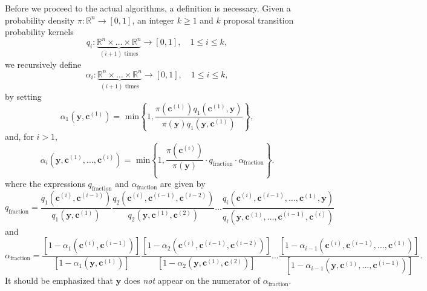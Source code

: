 Before we proceed to the actual algorithms, a definition is necessary.
Given a probability density $\pi:\mathbb{R}^n\rightarrow [0,1]$,
an integer $k\geqslant 1$ and
$k$ proposal transition probability kernels
\begin{equation*}
q_i:\underbrace{\mathbb{R}^n\times\ldots\times\mathbb{R}^n}_{(i+1)\mbox{ times}}\rightarrow [0,1],\quad 1\leqslant i\leqslant k,
\end{equation*}
we recursively define
\begin{equation}\label{eq-alphas}
\alpha_i:\underbrace{\mathbb{R}^n\times\ldots\times\mathbb{R}^n}_{(i+1)\mbox{ times}}\rightarrow [0,1],\quad 1\leqslant i\leqslant k,
\end{equation}
by setting
\begin{equation*}
\alpha_1(\mathbf{y},\mathbf{c}^{(1)}) = \mbox{ min}
\left\{
1,\frac
{\pi(\mathbf{c}^{(1)})q_1(\mathbf{c}^{(1)},\mathbf{y})}
{\pi(\mathbf{y})q_1(\mathbf{y},\mathbf{c}^{(1)})}
\right\},
\end{equation*}
and, for $i>1$,
\begin{equation*}
\alpha_i(\mathbf{y},\mathbf{c}^{(1)},\ldots,\mathbf{c}^{(i)}) = \mbox{ min}
\left\{
1,\frac
{\pi(\mathbf{c}^{(i)})}
{\pi(\mathbf{y})}
\cdot q_{\mbox{fraction}}
\cdot \alpha_{\mbox{fraction}}
\right\}.
\end{equation*}
where
the expressions $q_{\mbox{fraction}}$ and $\alpha_{\mbox{fraction}}$ are given by
\begin{equation*}
q_{\mbox{fraction}}=
\frac
{q_1(\mathbf{c}^{(i)},\mathbf{c}^{(i-1)})}
{q_1(\mathbf{y},\mathbf{c}^{(1)})}
\frac
{q_2(\mathbf{c}^{(i)},\mathbf{c}^{(i-1)},\mathbf{c}^{(i-2)})}
{q_2(\mathbf{y},\mathbf{c}^{(1)},\mathbf{c}^{(2)})}
\ldots
\frac
{q_i(\mathbf{c}^{(i)},\mathbf{c}^{(i-1)},\ldots,\mathbf{c}^{(1)},\mathbf{y})}
{q_i(\mathbf{y},\mathbf{c}^{(1)},\ldots,\mathbf{c}^{(i-1)},\mathbf{c}^{(i)})}
\end{equation*}
and
\begin{equation*}
\alpha_{\mbox{fraction}}=
\frac
{[1-\alpha_1(\mathbf{c}^{(i)},\mathbf{c}^{(i-1)})]}
{[1-\alpha_1(\mathbf{y},\mathbf{c}^{(1)})]}
\frac
{[1-\alpha_2(\mathbf{c}^{(i)},\mathbf{c}^{(i-1)},\mathbf{c}^{(i-2)})]}
{[1-\alpha_2(\mathbf{y},\mathbf{c}^{(1)},\mathbf{c}^{(2)})]}
\ldots
\frac
{[1-\alpha_{i-1}(\mathbf{c}^{(i)},\mathbf{c}^{(i-1)},\ldots,\mathbf{c}^{(1)})]}
{[1-\alpha_{i-1}(\mathbf{y},\mathbf{c}^{(1)},\ldots,\mathbf{c}^{(i-1)})]}.
\end{equation*}
It should be emphasized that $\mathbf{y}$ does {\it not} appear on the numerator of $\alpha_{\mbox{fraction}}$.

